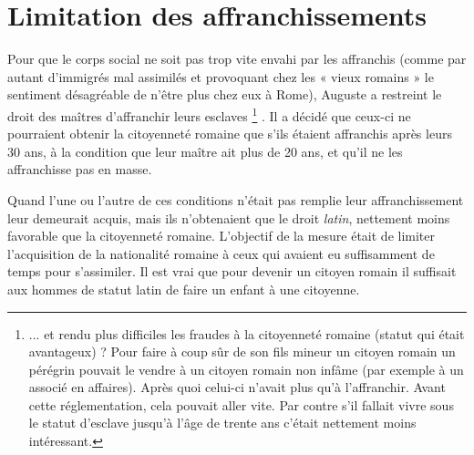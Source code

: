 \section{Limitation des affranchissements}

 Pour que le corps social ne soit pas trop vite envahi par les affranchis (comme par autant d'immigrés mal assimilés et provoquant chez les « vieux romains » le sentiment désagréable de n'être plus chez eux à Rome), Auguste a restreint le droit des maîtres d'affranchir leurs esclaves%
\footnote{... et rendu plus difficiles les fraudes à la citoyenneté romaine (statut qui était avantageux) ? Pour faire à coup sûr de son fils mineur un citoyen romain un pérégrin pouvait le vendre à un citoyen romain non infâme (par exemple à un associé en affaires). Après quoi celui-ci n'avait plus qu'à l'affranchir. Avant cette réglementation, cela pouvait aller vite. Par contre s'il fallait vivre sous le statut d'esclave jusqu'à l'âge de trente ans c'était nettement moins intéressant.}%
. Il a décidé que ceux-ci ne pourraient obtenir la citoyenneté romaine que s'ils étaient affranchis après leurs 30 ans, à la condition que leur maître ait plus de 20 ans, et qu'il ne les affranchisse pas en masse. 

 Quand l'une ou l'autre de ces conditions n'était pas remplie leur affranchissement leur demeurait acquis, mais ils n'obtenaient que le droit \emph{latin}, nettement moins favorable que la citoyenneté romaine. L'objectif de la mesure était de limiter l'acquisition de la nationalité romaine à ceux qui avaient eu suffisamment de temps pour s'assimiler. Il est vrai que pour devenir un citoyen romain il suffisait aux hommes de statut latin de faire un enfant à une citoyenne.
 
 